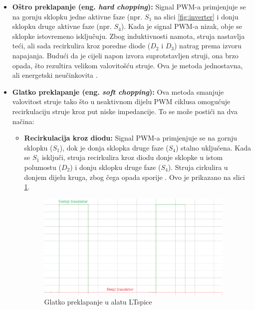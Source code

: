 \documentclass[diplomskirad]{fer}
\begin{document}
\begin{itemize}
	\item \textbf{Oštro preklapanje (eng. \textit{hard chopping}):}
	      Signal PWM-a primjenjuje se na gornju sklopku jedne aktivne faze (npr. $S_1$ na slici
	      \ref{fig:inverter} i donju sklopku druge aktivne faze (npr. $S_4$). Kada je signal PWM-a nizak, obje se sklopke istovremeno isključuju. Zbog induktivnosti namota,
	      struja nastavlja teći, ali sada recirkulira kroz poredne diode ($D_2$ i $D_3$) natrag
	      prema izvoru napajanja. Budući da je cijeli napon izvora suprotstavljen struji,
	      ona brzo opada, što rezultira velikom valovitošću struje. Ova je metoda
	      jednostavna, ali energetski neučinkovita \cite{TI2015}.

	\item \textbf{Glatko preklapanje (eng. \textit{soft chopping}):}
	      Ova metoda smanjuje valovitost struje tako što u neaktivnom dijelu PWM
	      ciklusa omogućuje recirkulaciju struje kroz put niske impedancije. To se
	      može postići na dva načina:
	      \begin{itemize}
		      \item \textbf{Recirkulacija kroz diodu:} Signal PWM-a primjenjuje se na
		            gornju sklopku ($S_1$), dok je donja sklopka druge faze ($S_4$) stalno
		            uključena. Kada se $S_1$ isključi, struja recirkulira kroz diodu donje
		            sklopke u istom polumostu ($D_2$) i donju sklopku druge faze ($S_4$).
		            Struja cirkulira u donjem dijelu kruga, zbog čega opada sporije \cite{TI2015}. Ovo je
		            prikazano na slici \ref{fig:hard_chopping}.
		            \begin{figure}[h!]
			            \centering
			            \includegraphics[width=0.95\textwidth]{Figures/hard_chopping1.png}
			            \caption{Glatko preklapanje u alatu LTspice}
			            \label{fig:hard_chopping}
		            \end{figure}


\end{itemize}
\end{itemize}
\end{document}
